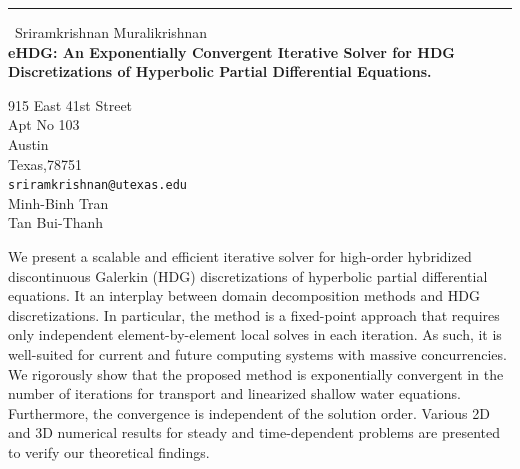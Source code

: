 \documentclass{report}
\begin{document}
\begin{center}
\rule{6in}{1pt} \
{\large Sriramkrishnan Muralikrishnan \\
{\bf eHDG: An Exponentially Convergent Iterative Solver for HDG Discretizations of Hyperbolic Partial Differential Equations.}}

915 East 41st Street \\ Apt No 103 \\ Austin \\ Texas,78751
\\
{\tt sriramkrishnan@utexas.edu}\\
Minh-Binh Tran\\
Tan Bui-Thanh\end{center}

We present a scalable and efficient iterative solver for high-order
hybridized discontinuous Galerkin (HDG) discretizations of hyperbolic
partial differential equations. It an interplay between domain
decomposition methods and HDG discretizations. In particular, the method
is a fixed-point approach that requires only independent
element-by-element local solves in each iteration. As such, it is
well-suited for current and future computing systems with massive
concurrencies. We rigorously
show that the proposed method is exponentially convergent in the number
of iterations for transport and linearized shallow water
equations. Furthermore, the convergence is independent of the solution
order. Various 2D and 3D numerical results for steady and
time-dependent problems are presented to verify our theoretical
findings.
\end{document}
